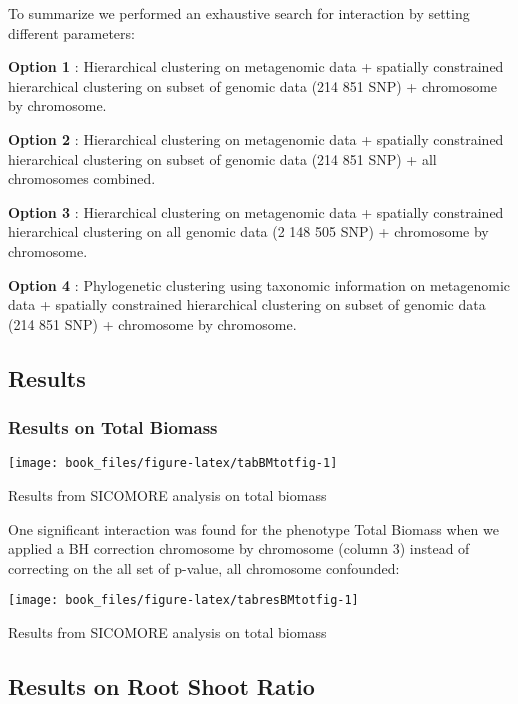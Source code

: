\documentclass[]{book}
\begin{document}
To summarize we performed an exhaustive search for interaction by
setting different parameters:

\textbf{Option 1} : Hierarchical clustering on metagenomic data + spatially constrained hierarchical clustering on subset of genomic data (214 851 SNP) + chromosome by chromosome.

\textbf{Option 2} : Hierarchical clustering on metagenomic data + spatially constrained hierarchical clustering on subset of genomic data (214 851 SNP) + all chromosomes combined.

\textbf{Option 3} : Hierarchical clustering on metagenomic data + spatially constrained hierarchical clustering on all genomic data (2 148 505 SNP) + chromosome by chromosome.

\textbf{Option 4} : Phylogenetic clustering using taxonomic information on metagenomic data + spatially constrained hierarchical clustering on subset of genomic data (214 851 SNP) + chromosome by chromosome.

\hypertarget{results-1}{%
\subsection{Results}\label{results-1}}

\hypertarget{results-on-total-biomass}{%
\subsubsection{Results on Total Biomass}\label{results-on-total-biomass}}

\begin{center}\texttt{[image: book\_files/figure-latex/tabBMtotfig-1]} \end{center}

\label{tab:tabBMtot}Results from SICOMORE analysis on total biomass

One significant interaction was found for the phenotype Total Biomass
when we applied a BH correction chromosome by chromosome (column 3)
instead of correcting on the all set of p-value, all chromosome
confounded:

\begin{center}\texttt{[image: book\_files/figure-latex/tabresBMtotfig-1]} \end{center}

\label{tab:tabresBMtot}Results from SICOMORE analysis on total biomass

\hypertarget{results-on-root-shoot-ratio}{%
\subsection{Results on Root Shoot Ratio}\label{results-on-root-shoot-ratio}}
\end{document}
